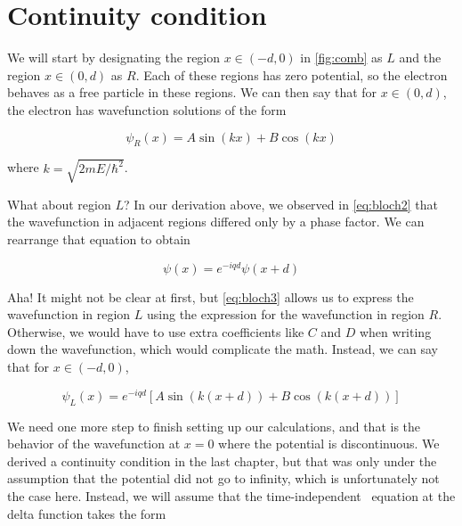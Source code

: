 \section{Continuity condition}

We will start by designating the region $x \in (-d, 0)$ in \autoref{fig:comb} as $L$ and the region $x \in (0, d)$ as $R$. 
Each of these regions has zero potential, so the electron behaves as a free particle in these regions. 
We can then say that for $x \in (0, d)$, the electron has wavefunction solutions of the form 

\begin{equation}
	\psi_R(x) = A\sin(kx) + B\cos(kx) \label{eq:kpr}
\end{equation}

\noindent where $k = \sqrt{2mE/\hbar^2}$.

What about region $L$? 
In our derivation above, we observed in \autoref{eq:bloch2} that the wavefunction in adjacent regions differed only by a phase factor. 
We can rearrange that equation to obtain

\begin{equation}
	\psi(x) = e^{-iqd}\psi(x+d) \label{eq:bloch3}
\end{equation}

Aha! It might not be clear at first, but \autoref{eq:bloch3} allows us to express the wavefunction in region $L$ using the expression for the wavefunction in region $R$. 
Otherwise, we would have to use extra coefficients like $C$ and $D$ when writing down the wavefunction, which would complicate the math. 
Instead, we can say that for $x \in (-d,0)$, 

\begin{equation}
	\psi_L(x) = e^{-iqd}\left[A\sin(k(x+d)) + B\cos(k(x+d))\right] \label{eq:kpl}
\end{equation}

We need one more step to finish setting up our calculations, and that is the behavior of the wavefunction at $x = 0$ where the potential is discontinuous. 
We derived a continuity condition in the last chapter, but that was only under the assumption that the potential did not go to infinity, which is unfortunately not the case here. 
Instead, we will assume that the time-independent \Sch\ equation at the delta function takes the form 

